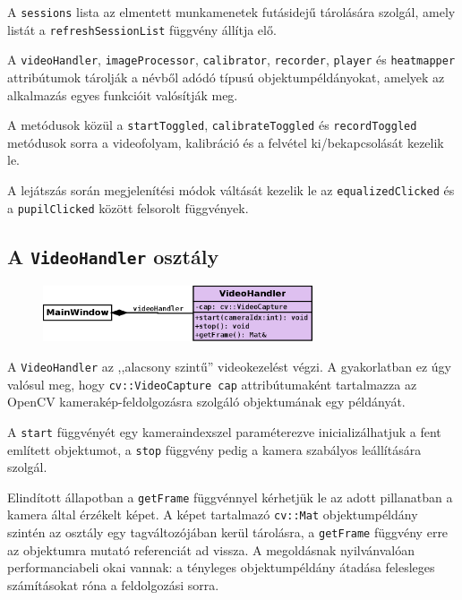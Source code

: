 A \texttt{sessions} lista az elmentett munkamenetek futásidejű tárolására szolgál, amely listát a \texttt{refreshSessionList} függvény állítja elő.

A \texttt{videoHandler}, \texttt{imageProcessor}, \texttt{calibrator}, \texttt{recorder}, \texttt{player} és \texttt{heatmapper} attribútumok tárolják a névből adódó típusú objektumpéldányokat, amelyek az alkalmazás egyes funkcióit valósítják meg.

A metódusok közül a \texttt{startToggled}, \texttt{calibrateToggled} és \texttt{recordToggled} metódusok sorra a videofolyam, kalibráció és a felvétel ki/bekapcsolását kezelik le.

A lejátszás során megjelenítési módok váltását kezelik le az \texttt{equalizedClicked} és a \texttt{pupilClicked} között felsorolt függvények.

\subsection{A \texttt{VideoHandler} osztály}\label{sect:videohandler}

\begin{figure}[!ht]
\centering
\includegraphics[width=80mm, keepaspectratio]{figures/class_videohandler.png}
\end{figure}

A \texttt{VideoHandler} az ,,alacsony szintű'' videokezelést végzi. A gyakorlatban ez úgy valósul meg, hogy \texttt{cv::VideoCapture cap} attribútumaként tartalmazza az OpenCV kamerakép-feldolgozásra szolgáló objektumának egy példányát.

A \texttt{start} függvényét egy kameraindexszel paraméterezve inicializálhatjuk a fent említett objektumot, a \texttt{stop} függvény pedig a kamera szabályos leállítására szolgál.

Elindított állapotban a \texttt{getFrame} függvénnyel kérhetjük le az adott pillanatban a kamera által érzékelt képet. A képet tartalmazó \texttt{cv::Mat} objektumpéldány szintén az osztály egy tagváltozójában kerül tárolásra, a \texttt{getFrame} függvény erre az objektumra mutató referenciát ad vissza. A megoldásnak nyilvánvalóan performanciabeli okai vannak: a tényleges objektumpéldány átadása felesleges számításokat róna a feldolgozási sorra.

